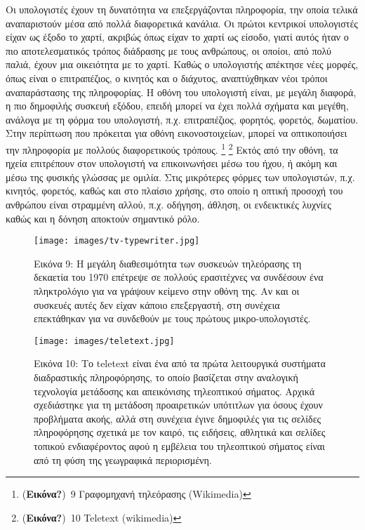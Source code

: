 \documentclass[
]{article}
\begin{document}
Οι υπολογιστές έχουν τη δυνατότητα να επεξεργάζονται πληροφορία, την
οποία τελικά αναπαριστούν μέσα από πολλά διαφορετικά κανάλια. Οι πρώτοι
κεντρικοί υπολογιστές είχαν ως έξοδο το χαρτί, ακριβώς όπως είχαν το
χαρτί ως είσοδο, γιατί αυτός ήταν ο πιο αποτελεσματικός τρόπος διάδρασης
με τους ανθρώπους, οι οποίοι, από πολύ παλιά, έχουν μια οικειότητα με το
χαρτί. Καθώς ο υπολογιστής απέκτησε νέες μορφές, όπως είναι ο
επιτραπέζιος, ο κινητός και ο διάχυτος, αναπτύχθηκαν νέοι τρόποι
αναπαράστασης της πληροφορίας. Η οθόνη του υπολογιστή είναι, με μεγάλη
διαφορά, η πιο δημοφιλής συσκευή εξόδου, επειδή μπορεί να έχει πολλά
σχήματα και μεγέθη, ανάλογα με τη φόρμα του υπολογιστή, π.χ.
επιτραπέζιος, φορητός, φορετός, δωματίου. Στην περίπτωση που πρόκειται
για οθόνη εικονοστοιχείων, μπορεί να οπτικοποιήσει την πληροφορία με
πολλούς διαφορετικούς τρόπους. \footnote{(\textbf{Εικόνα?})~9
  Γραφομηχανή τηλεόρασης (Wikimedia)} \footnote{(\textbf{Εικόνα?})~10
  Teletext (wikimedia)} Εκτός από την οθόνη, τα ηχεία επιτρέπουν στον
υπολογιστή να επικοινωνήσει μέσω του ήχου, ή ακόμη και μέσω της φυσικής
γλώσσας με ομιλία. Στις μικρότερες φόρμες των υπολογιστών, π.χ. κινητός,
φορετός, καθώς και στο πλαίσιο χρήσης, στο οποίο η οπτική προσοχή του
ανθρώπου είναι στραμμένη αλλού, π.χ. οδήγηση, άθληση, οι ενδεικτικές
λυχνίες καθώς και η δόνηση αποκτούν σημαντικό ρόλο.

\leavevmode{}%
\begin{figure}
\hypertarget{fig:tv-typewriter}{%
\centering
\texttt{[image: images/tv-typewriter.jpg]}
\caption{Εικόνα 9: Η μεγάλη διαθεσιμότητα των συσκευών τηλεόρασης τη
δεκαετία του 1970 επέτρεψε σε πολλούς ερασιτέχνες να συνδέσουν ένα
πληκτρολόγιο για να γράψουν κείμενο στην οθόνη της. Αν και οι συσκευές
αυτές δεν είχαν κάποιο επεξεργαστή, στη συνέχεια επεκτάθηκαν για να
συνδεθούν με τους πρώτους μικρο-υπολογιστές.}\label{fig:tv-typewriter}
}
\end{figure}

\leavevmode{}%
\begin{figure}
\hypertarget{fig:teletext}{%
\centering
\texttt{[image: images/teletext.jpg]}
\caption{Εικόνα 10: Το teletext είναι ένα από τα πρώτα λειτουργικά
συστήματα διαδραστικής πληροφόρησης, το οποίο βασίζεται στην αναλογική
τεχνολογία μετάδοσης και απεικόνισης τηλεοπτικού σήματος. Αρχικά
σχεδιάστηκε για τη μετάδοση προαιρετικών υπότιτλων για όσους έχουν
προβλήματα ακοής, αλλά στη συνέχεια έγινε δημοφιλές για τις σελίδες
πληροφόρησης σχετικά με τον καιρό, τις ειδήσεις, αθλητικά και σελίδες
τοπικού ενδιαφέροντος αφού η εμβέλεια του τηλεοπτικού σήματος είναι από
τη φύση της γεωγραφικά περιορισμένη.}\label{fig:teletext}
}
\end{figure}
\end{document}
